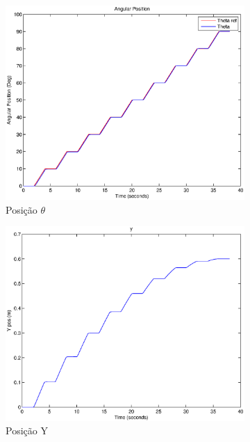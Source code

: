\documentclass{article}
\begin{document}
\begin{figure}[H]
	\centering
	\begin{subfigure}{0.32\textwidth}
		\includegraphics[width=\linewidth]{matlab/theta6}
		\caption{Posição $\theta$}
	\end{subfigure}
	\begin{subfigure}{0.32\textwidth}
		\includegraphics[width=\linewidth]{matlab/y6}
		\caption{Posição Y}
	\end{subfigure}
	\begin{subfigure}{0.32\textwidth}

\end{subfigure}
\end{figure}
\end{document}
